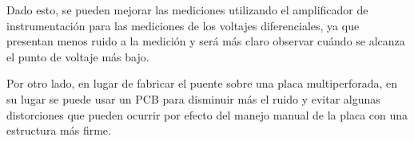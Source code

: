     Dado esto, se pueden mejorar las mediciones utilizando el amplificador de instrumentación
    para las mediciones de los voltajes diferenciales, ya que presentan menos ruido a la medición
    y será más claro observar cuándo se alcanza el punto de voltaje más bajo.

    Por otro lado, en lugar de fabricar el puente sobre una placa multiperforada, en su lugar
    se puede usar un PCB para disminuir más el ruido y evitar algunas distorciones que pueden
    ocurrir por efecto del manejo manual de la placa con una estructura más firme.